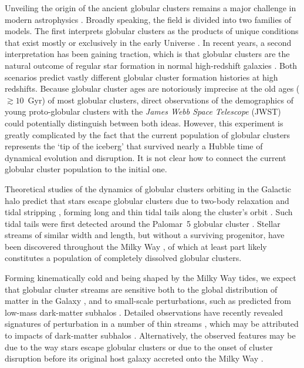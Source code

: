 \documentclass[twocolumn]{aastex63}
\begin{document}
Unveiling the origin of the ancient globular clusters remains a major challenge in modern astrophysics \citep[e.g.][]{brodie:2006,kruijssen:2014,forbes:2018,adamo:2020}.
Broadly speaking, the field is divided into two families of models.
The first interprets globular clusters as the products of unique conditions that exist mostly or exclusively in the early Universe \citep[e.g.][]{peebles:1968,fall:1985,ashman:1992,trenti:2015,madau:2020}.
In recent years, a second interpretation has been gaining traction, which is that globular clusters are the natural outcome of regular star formation in normal high-redshift galaxies \citep[e.g.][]{kravtsov:2005,kruijssen15b,pfeffer:2018,keller:2020}.
Both scenarios predict vastly different globular cluster formation histories at high redshifts.
Because globular cluster ages are notoriously imprecise at the old ages ($\gtrsim10$~Gyr) of most globular clusters, direct observations of the demographics of young proto-globular clusters with the \textit{James Webb Space Telescope} (JWST) could potentially distinguish between both ideas.
However, this experiment is greatly complicated by the fact that the current population of globular clusters represents the `tip of the iceberg' that survived nearly a Hubble time of dynamical evolution and disruption.
It is not clear how to connect the current globular cluster population to the initial one.

Theoretical studies of the dynamics of globular clusters orbiting in the Galactic halo predict that stars escape globular clusters due to two-body relaxation and tidal stripping \citep[often referred to as `evaporation', e.g.,][]{spitzer:1987, baumgardt03}, forming long and thin tidal tails along the cluster's orbit \citep{combes:1999}.
Such tidal tails were first detected around the Palomar~5 globular cluster \citep{odenkirchen:2001, rockosi:2002}.
Stellar streams of similar width and length, but without a surviving progenitor, have been discovered throughout the Milky Way \citep[e.g.,][]{gd:2006, grillmair:2009, bonaca:2012, shipp:2018, ibata:2019}, of which at least part likely constitutes a population of completely dissolved globular clusters.

Forming kinematically cold and being shaped by the Milky Way tides, we expect that globular cluster streams are sensitive both to the global distribution of matter in the Galaxy \citep[e.g.,][]{lux:2013, bonaca:2014, sanders:2014}, and to small-scale perturbations, such as predicted from low-mass dark-matter subhalos \citep[e.g.,][]{ibata:2002, yoon:2011, erkal:2016}.
Detailed observations have recently revealed signatures of perturbation in a number of thin streams \citep[e.g.,][]{pwb, bonaca:2019a, bonaca:2020, li:2020}, which may be attributed to impacts of dark-matter subhalos \citep[e.g.,][]{bonaca:2019b, banik:2019}.
Alternatively, the observed features may be due to the way stars escape globular clusters \citep[e.g.,][]{kuepper:2008, kuepper:2010} or due to the onset of cluster disruption before its original host galaxy accreted onto the Milky Way \citep[e.g.,][]{carlberg:2018, malhan:2020}.
\end{document}
